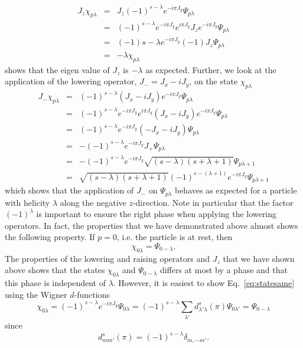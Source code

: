 \begin{eqnarray}
J_z\chi_{p\lambda} & = & J_z(-1)^{s-\lambda}e^{-i\pi J_y}\Psi_{p\lambda}\nonumber\\
                   & = & (-1)^{s-\lambda}e^{-i\pi J_y} e^{i\pi J_y} 
                          J_z e^{-i\pi J_y}\Psi_{p\lambda}\nonumber\\
                   & = & (-1){s-\lambda}e^{-i\pi J_y}(-1)J_z\Psi_{p\lambda}\nonumber\\
                   & = & -\lambda \chi_{p\lambda}
\end{eqnarray}
shows that the eigen value of $J_z$ is $-\lambda$ as expected. Further, we look
at the application of the lowering operator, $J_{-}=J_x-iJ_y$, on the 
state $\chi_{p\lambda}$
\begin{eqnarray}
J_-\chi_{p\lambda} & = & (-1)^{s-\lambda}(J_x-iJ_y)e^{-i\pi J_y}\Psi_{p\lambda}\nonumber\\
                   & = & (-1)^{s-\lambda}e^{-i\pi J_y}e^{i\pi J_y}(J_x-iJ_y)
                                         e^{-i\pi J_y}\Psi_{p\lambda}\nonumber\\
                   & = & (-1)^{s-\lambda}e^{-i\pi J_y}(-J_x-iJ_y)\Psi_{p\lambda}\nonumber\\
                   & = & -(-1)^{s-\lambda}e^{-i\pi J_y}J_+\Psi_{p\lambda}\nonumber\\
                   & = & -(-1)^{s-\lambda}e^{-i\pi J_y}\sqrt{(s-\lambda)(s+\lambda+1)}
                            \Psi_{p\lambda+1}\nonumber\\
	           & = & \sqrt{(s-\lambda)(s+\lambda+1)}(-1)^{s-(\lambda+1)}
                         e^{-i\pi J_y}\Psi_{p\lambda+1}
\end{eqnarray}
which shows that the application of $J_-$ on $\Psi_{p\lambda}$ behaves
as expected for a particle with helicity $\lambda$ along the 
negative $z$-direction. Note in particular that the factor $(-1)^{\lambda}$
is important to ensure the right phase when applying the lowering
operators. 
In fact, the properties that we have demonstrated above almost shows
the following property. If $p=0$, i.e. the particle is at rest, then
\begin{equation}
\chi_{0\lambda}=\Psi_{0-\lambda}.
\label{eq:statesame}
\end{equation}
The properties of the lowering
and raising operators and $J_z$ that we have shown above shows that the
states $\chi_{0\lambda}$ and $\Psi_{0-\lambda}$ differs at most by a 
phase and that this phase is independent of $\lambda$. However, it
is easiest to show Eq.~\ref{eq:statesame} using the Wigner 
$d$-functions
\begin{equation}
\chi_{0\lambda}=(-1)^{s-\lambda}e^{-i\pi J_y}\Psi_{0\lambda}
 = (-1)^{s-\lambda}\sum_{\lambda'}d^s_{\lambda'\lambda}(\pi)\Psi_{0\lambda'}
 = \Psi_{0-\lambda}
\end{equation}
since
\begin{equation}
d^s_{mm'}(\pi)=(-1)^{s-\lambda}\delta_{m,-m'}.
\end{equation}

